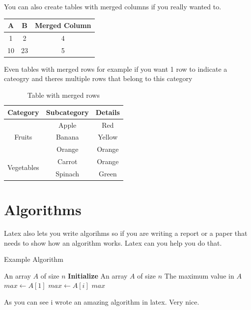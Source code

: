 \documentclass{article}
\begin{document}
You can also create tables with merged columns if you really wanted to. \\
\begin{tabular}{|c|c|c|c|}
\hline
A & B & \multicolumn{2}{|c|}{Merged Column} \\ \hline
1 & 2 & \multicolumn{2}{|c|}{4} \\ \hline
10 & 23 & \multicolumn{2}{|c|}{5 \quad 6} \\ \hline
\end{tabular}

Even tables with merged rows for example if you want 1 row to indicate a cateogry and theres multiple rows that belong to this category
\begin{table}[h!]
\centering
\begin{tabular}{|c|c|c|}
\hline
\textbf{Category} & \textbf{Subcategory} & \textbf{Details} \\ \hline
\multirow{3}{*}{Fruits} & Apple & Red \\ \cline{2-3}
                        & Banana & Yellow \\ \cline{2-3}
                        & Orange & Orange \\ \hline
\multirow{2}{*}{Vegetables} & Carrot & Orange \\ \cline{2-3}
                            & Spinach & Green \\ \hline
\end{tabular}
\caption{Table with merged rows}
\label{tab:merged-rows}
\end{table}


\section{Algorithms}
Latex also lets you write algorihms so if you are writing a report or a paper that needs to show how an algorithm works. Latex can you help you do that.

\begin{algorithm}
\caption{Example Algorithm}
\begin{algorithmic}[1]
\Require An array $A$ of size $n$ 
\State \textbf{Initialize} An array $A$ of size $n$ 
\State The maximum value in $A$ 
\State $max \gets A[1]$
        \State $max \gets A[i]$ 
    \EndIf
\EndFor
\State \Return $max$
\end{algorithmic}
\end{algorithm}
As you can see i wrote an amazing algorithm in latex. Very nice.
\clearpage
\end{document}
